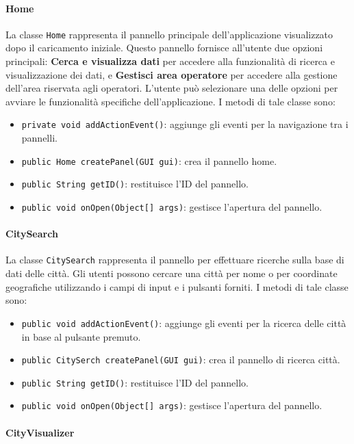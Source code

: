 \paragraph{Home}
La classe \texttt{Home} rappresenta il pannello principale dell'applicazione visualizzato dopo il caricamento iniziale.
Questo pannello fornisce all'utente due opzioni principali: \textbf{Cerca e visualizza dati} per accedere alla funzionalità di ricerca e visualizzazione dei dati, e \textbf{Gestisci area operatore} per accedere alla gestione dell'area riservata agli operatori.
L'utente può selezionare una delle opzioni per avviare le funzionalità specifiche dell'applicazione.
I metodi di tale classe sono:
\begin{itemize}
    \item \texttt{private void addActionEvent()}: aggiunge gli eventi per la navigazione tra i pannelli.
    \item \texttt{public Home createPanel(GUI gui)}: crea il pannello home.
    \item \texttt{public String getID()}: restituisce l'ID del pannello.
    \item \texttt{public void onOpen(Object[] args)}: gestisce l'apertura del pannello.
\end{itemize}

\paragraph{CitySearch}
La classe \texttt{CitySearch} rappresenta il pannello  per effettuare ricerche sulla base di dati delle città.
Gli utenti possono cercare una città per nome o per coordinate geografiche utilizzando i campi di input e i pulsanti forniti.
I metodi di tale classe sono:
\begin{itemize}
    \item \texttt{public void addActionEvent()}: aggiunge gli eventi per la ricerca delle città in base al pulsante premuto.
    \item \texttt{public CitySerch createPanel(GUI gui)}: crea il pannello di ricerca città.
    \item \texttt{public String getID()}: restituisce l'ID del pannello.
    \item \texttt{public void onOpen(Object[] args)}: gestisce l'apertura del pannello.
\end{itemize}

\paragraph{CityVisualizer}

